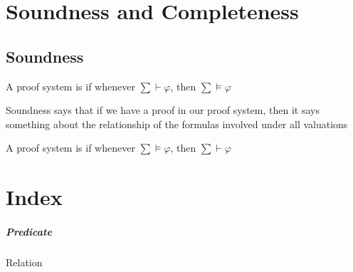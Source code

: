 \documentclass{report}
\begin{document}
\chapter{Soundness and Completeness}
\section{Soundness}
\begin{defbox}
A proof system is  if whenever $\sum \vdash\varphi$, then $\sum \vDash\varphi$
\end{defbox}
Soundness says that if we have a proof in our proof system, then it says something about the relationship of the formulas involved under all valuations
\begin{defbox}
A proof system is  if whenever $\sum \vDash\varphi$, then $\sum \vdash\varphi$
\end{defbox}
\chapter{Index}
\paragraph{Predicate} Relation
\end{document}
